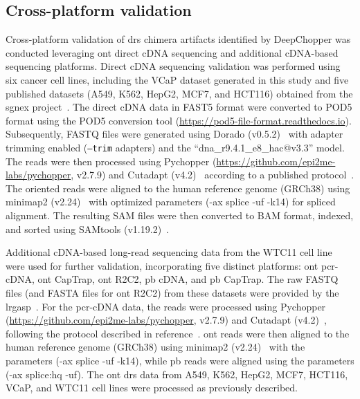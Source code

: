 \documentclass[pdflatex,sn-nature, lineno]{sn-jnl}%
\begin{document}
\subsection{Cross-platform validation}

Cross-platform validation of \gls{drs} chimera artifacts identified by DeepChopper was conducted leveraging \gls{ont} direct cDNA sequencing and additional cDNA-based sequencing platforms.
Direct cDNA sequencing validation was performed using six cancer cell lines, including the VCaP dataset generated in this study and five published datasets (A549, K562, HepG2, MCF7, and HCT116) obtained from the \gls{sgnex} project~\cite{chen2021systematic}.
The direct cDNA data in FAST5 format were converted to POD5 format using the POD5 conversion tool (\url{https://pod5-file-format.readthedocs.io}).
Subsequently, FASTQ files were generated using Dorado (v0.5.2)~\cite{dorado2023} with adapter trimming enabled (\texttt{--trim} adapters) and the ``dna\_r9.4.1\_e8\_hac@v3.3'' model.
The reads were then processed using Pychopper (\url{https://github.com/epi2me-labs/pychopper}, v2.7.9) and Cutadapt (v4.2)~\cite{martin2011cutadapt} according to a published protocol~\cite{grunberger2022nanopore}.
The oriented reads were aligned to the human reference genome (GRCh38) using minimap2 (v2.24)~\cite{li2018minimap2} with optimized parameters (-ax splice -uf -k14) for spliced alignment.
The resulting SAM files were then converted to BAM format, indexed, and sorted using SAMtools (v1.19.2)~\cite{li2009sequence}.

Additional cDNA-based long-read sequencing data from the WTC11 cell line were used for further validation, incorporating five distinct platforms: \gls{ont} \gls{pcr}-cDNA, \gls{ont} CapTrap, \gls{ont} R2C2, \gls{pb} cDNA, and \gls{pb} CapTrap.
The raw FASTQ files (and FASTA files for \gls{ont} R2C2) from these datasets were provided by the \gls{lrgasp}~\cite{pardo2024systematic}.
For the \gls{pcr}-cDNA data, the reads were processed using Pychopper (\url{https://github.com/epi2me-labs/pychopper}, v2.7.9) and Cutadapt (v4.2)~\cite{martin2011cutadapt}, following the protocol described in reference~\cite{grunberger2022nanopore}. \gls{ont} reads were then aligned to the human reference genome (GRCh38) using minimap2 (v2.24)~\cite{li2018minimap2} with the parameters (-ax splice -uf -k14), while \gls{pb} reads were aligned using the parameters (-ax splice:hq -uf).
The \gls{ont} \gls{drs} data from A549, K562, HepG2, MCF7, HCT116, VCaP, and WTC11 cell lines were processed as previously described.
\end{document}
